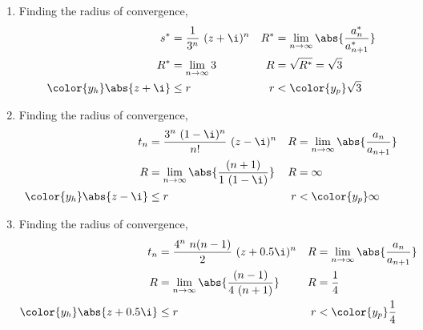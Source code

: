 \begin{enumerate}
    \item Finding the radius of convergence,
          \begin{align}
              s^*          & = \frac{1}{3^n}\ (z + \i)^n                           &
              R^*          & = \lim_{n \to \infty} \abs{\frac{a^*_{n}}{a^*_{n+1}}}   \\
              R^*          & = \lim_{n \to \infty} 3                               &
              R            & = \sqrt{R^*} = \sqrt{3}                                 \\
              \color{y_h}
              \abs{z + \i} & \leq r                                                &
              r            & < \color{y_p} \sqrt{3}
          \end{align}

    \item Finding the radius of convergence,
          \begin{align}
              t_n          & = \frac{3^n\ (1-\i)^n}{n!}\ (z - \i)^n                &
              R            & = \lim_{n \to \infty} \abs{\frac{a_{n}}{a_{n+1}}}       \\
              R            & = \lim_{n \to \infty} \abs{\frac{(n+1)}{1\ (1 - \i)}} &
              R            & = \infty                                                \\
              \color{y_h}
              \abs{z - \i} & \leq r                                                &
              r            & < \color{y_p} \infty
          \end{align}

    \item Finding the radius of convergence,
          \begin{align}
              t_n             & = \frac{4^n\ n(n-1)}{2}\ (z + 0.5\i)^n               &
              R               & = \lim_{n \to \infty} \abs{\frac{a_{n}}{a_{n+1}}}      \\
              R               & = \lim_{n \to \infty} \abs{\frac{(n-1)}{4\ (n + 1)}} &
              R               & = \frac{1}{4}                                          \\
              \color{y_h}
              \abs{z + 0.5\i} & \leq r                                               &
              r               & < \color{y_p} \frac{1}{4}
          \end{align}


\end{enumerate}
